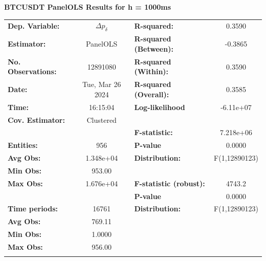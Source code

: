 \documentclass[a4paper, oneside, notitlepage]{book}
\begin{document}
\begin{table}[htbp!]
\textbf{BTCUSDT PanelOLS Results for h = 1000ms}
\begin{center}
\begin{tabular}{lclc}
\hline
\textbf{Dep. Variable:}    &         $\Delta p_{\delta}$         & \textbf{  R-squared:         }   &      0.3590      \\
\textbf{Estimator:}        &      PanelOLS      & \textbf{  R-squared (Between):}  &     -0.3865      \\
\textbf{No. Observations:} &      12891080      & \textbf{  R-squared (Within):}   &      0.3590      \\
\textbf{Date:}             &  Tue, Mar 26 2024  & \textbf{  R-squared (Overall):}  &      0.3585      \\
\textbf{Time:}             &      16:15:04      & \textbf{  Log-likelihood     }   &    -6.11e+07     \\
\textbf{Cov. Estimator:}   &     Clustered      & \textbf{                     }   &                  \\
\textbf{}                  &                    & \textbf{  F-statistic:       }   &    7.218e+06     \\
\textbf{Entities:}         &        956         & \textbf{  P-value            }   &      0.0000      \\
\textbf{Avg Obs:}          &     1.348e+04      & \textbf{  Distribution:      }   &  F(1,12890123)   \\
\textbf{Min Obs:}          &       953.00       & \textbf{                     }   &                  \\
\textbf{Max Obs:}          &     1.676e+04      & \textbf{  F-statistic (robust):} &      4743.2      \\
\textbf{}                  &                    & \textbf{  P-value            }   &      0.0000      \\
\textbf{Time periods:}     &       16761        & \textbf{  Distribution:      }   &  F(1,12890123)   \\
\textbf{Avg Obs:}          &       769.11       & \textbf{                     }   &                  \\
\textbf{Min Obs:}          &       1.0000       & \textbf{                     }   &                  \\
\textbf{Max Obs:}          &       956.00       & \textbf{                     }   &                  \\
\textbf{}                  &                    & \textbf{                     }   &                  \\

\end{tabular}
\end{center}
\end{table}
\end{document}
